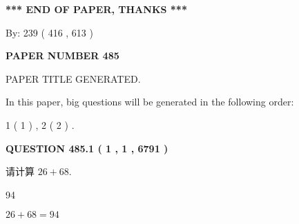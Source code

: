 \documentclass{ctexart}
\begin{document}
   
   
   
\vspace{1.0in} 
{\textbf{\large{ *** END OF PAPER, THANKS *** }}} 
   
   
\hspace{1.0in} By: 
 239 ( 416 ,  613 )
   
   
   
   
\newpage 
\setcounter{page}{ 
   485001 } 
   
   
   
   
 {\textbf{ \Large{ PAPER NUMBER  485  }}}
   
   
\vspace{0.2in}
   
   
   
   
   
   
   
   
 \vspace{0.2in}
 
 
 
 
   
   
 PAPER TITLE GENERATED.
   
   
   
\vspace{0.2in}
   
In this paper, big questions will be generated in the following order: 
   
   
   1 ( 1 )
 ,
   2 ( 2 )
 .
  
\vspace{0.2in}
  
{\textbf{\Large{QUESTION
485.1 
 ( 1 , 1 , 6791 )
}}}
  
  
 
请计算 $ %
26 +  %
68 $.
 
 
 
\noindent{}
 
 

94
 
 
\noindent{}
 
 

 
 
 
\noindent{}
 
 

$ %
26 +  %
68=   %
94$
 
\end{document}

